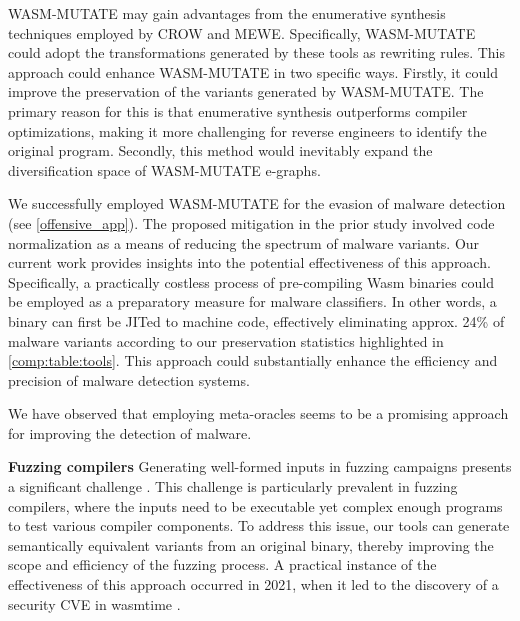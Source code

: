 WASM-MUTATE may gain advantages from the enumerative synthesis techniques employed by CROW and MEWE. 
Specifically, WASM-MUTATE could adopt the transformations generated by these tools as rewriting rules. 
This approach could enhance WASM-MUTATE in two specific ways. 
Firstly, it could improve the preservation of the variants generated by WASM-MUTATE. 
The primary reason for this is that enumerative synthesis outperforms compiler optimizations, making it more challenging for reverse engineers to identify the original program.
Secondly, this method would inevitably expand the diversification space of WASM-MUTATE e-graphs.


 We successfully employed WASM-MUTATE for the evasion of malware detection (see \autoref{offensive_app}). 
The proposed mitigation in the prior study involved code normalization as a means of reducing the spectrum of malware variants. 
Our current work provides insights into the potential effectiveness of this approach. 
Specifically, a practically costless process of pre-compiling Wasm binaries could be employed as a preparatory measure for malware classifiers. 
In other words, a \wasm binary can first be JITed to machine code, effectively eliminating approx. 24\% of malware variants according to our preservation statistics highlighted in \autoref{comp:table:tools}. 
This approach could substantially enhance the efficiency and precision of malware detection systems.


\begin{strategy}
    We have observed that employing meta-oracles seems to be a promising approach for improving the detection of \Wasm malware. 
\end{strategy}
    

\textbf{Fuzzing \Wasm compilers}
Generating well-formed inputs in fuzzing campaigns presents a significant challenge \cite{7958599}. 
This challenge is particularly prevalent in fuzzing compilers, where the inputs need to be executable yet complex enough programs to test various compiler components. 
To address this issue, our tools can generate semantically equivalent variants from an original \wasm binary, thereby improving the scope and efficiency of the fuzzing process. 
A practical instance of the effectiveness of this approach occurred in 2021, when it led to the discovery of a security CVE in wasmtime \cite{CVE}.




